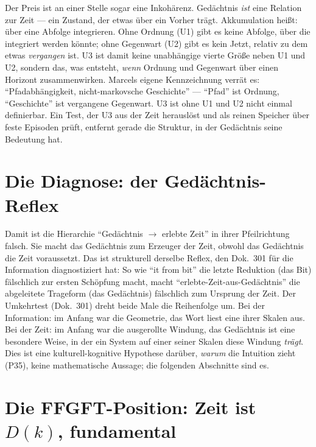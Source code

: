 Der Preis ist an einer Stelle sogar eine Inkohärenz. Gedächtnis \emph{ist} eine Relation
zur Zeit --- ein Zustand, der etwas über ein Vorher trägt. Akkumulation heißt: über eine
Abfolge integrieren. Ohne Ordnung (U1) gibt es keine Abfolge, über die integriert werden
könnte; ohne Gegenwart (U2) gibt es kein Jetzt, relativ zu dem etwas \emph{vergangen} ist.
U3 ist damit keine unabhängige vierte Größe neben U1 und U2, sondern das, was entsteht,
\emph{wenn} Ordnung und Gegenwart über einen Horizont zusammenwirken. Marcels eigene
Kennzeichnung verrät es: \enquote{Pfadabhängigkeit, nicht-markovsche Geschichte}
--- \enquote{Pfad} ist Ordnung, \enquote{Geschichte} ist vergangene Gegenwart. U3 ist ohne
U1 und U2 nicht einmal definierbar. Ein Test, der U3 aus der Zeit herauslöst und als reinen
Speicher über feste Episoden prüft, entfernt gerade die Struktur, in der Gedächtnis seine
Bedeutung hat.

\section{Die Diagnose: der Gedächtnis-Reflex}

Damit ist die Hierarchie \enquote{Gedächtnis $\to$ erlebte Zeit} in ihrer Pfeilrichtung
falsch. Sie macht das Gedächtnis zum Erzeuger der Zeit, obwohl das Gedächtnis die Zeit
voraussetzt. Das ist strukturell derselbe Reflex, den Dok.~301 für die Information
diagnostiziert hat: So wie \enquote{it from bit} die letzte Reduktion (das Bit)
fälschlich zur ersten Schöpfung macht, macht \enquote{erlebte-Zeit-aus-Gedächtnis} die
abgeleitete Trageform (das Gedächtnis) fälschlich zum Ursprung der Zeit. Der Umkehrtest
(Dok.~301) dreht beide Male die Reihenfolge um. Bei der Information: im Anfang war die
Geometrie, das Wort liest eine ihrer Skalen aus. Bei der Zeit: im Anfang war die
ausgerollte Windung, das Gedächtnis ist eine besondere Weise, in der ein System auf einer
seiner Skalen diese Windung \emph{trägt}. Dies ist eine kulturell-kognitive Hypothese
darüber, \emph{warum} die Intuition zieht (P35), keine mathematische Aussage; die
folgenden Abschnitte sind es.

\section{Die FFGFT-Position: Zeit ist $D(k)$, fundamental}

